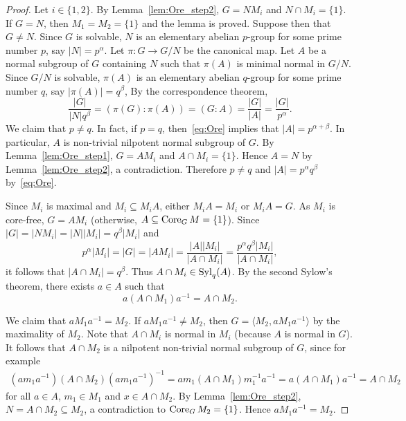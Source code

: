 \begin{proof}
    Let $i\in\{1,2\}$. 
    By Lemma~\ref{lem:Ore_step2}, $G=NM_i$ and $N\cap M_i=\{1\}$. If $G=N$, then 
    $M_1=M_2=\{1\}$ and the lemma is proved. Suppose then that $G\ne N$. Since 
    $G$ is solvable, $N$ is an elementary abelian $p$-group for some prime number $p$, 
    say $|N|=p^{\alpha}$. Let $\pi\colon G\to G/N$ be the canonical map. Let $A$ be a normal subgroup of $G$ 
    containing $N$ 
    such that $\pi(A)$ is minimal normal in $G/N$. Since $G/N$ is solvable, $\pi(A)$ is an 
    elementary abelian $q$-group for some prime number $q$, say $|\pi(A)|=q^\beta$, 
    By the correspondence theorem, 
    \begin{equation}
        \label{eq:Ore}
        \frac{|G|}{|N|q^\beta}=(\pi(G):\pi(A))=(G:A)=\frac{|G|}{|A|}=\frac{|G|}{p^\alpha}.
    \end{equation}
    We claim that $p\ne q$. In fact, if $p=q$, then~\eqref{eq:Ore} implies that $|A|=p^{\alpha+\beta}$. In particular, 
    $A$ is non-trivial nilpotent normal subgroup of $G$. 
    By Lemma~\ref{lem:Ore_step1}, $G=AM_i$ and $A\cap M_i=\{1\}$. Hence $A=N$ by Lemma~\ref{lem:Ore_step2}, a contradiction. 
    Therefore $p\ne q$ and $|A|=p^{\alpha}q^\beta$ by~\eqref{eq:Ore}. 

    Since $M_i$ is maximal and $M_i\subseteq M_iA$, either $M_iA=M_i$ or $M_iA=G$. As $M_i$ is core-free, 
    $G=AM_i$ (otherwise, $A\subseteq\operatorname{Core}_GM=\{1\}$). 
    Since $|G|=|NM_i|=|N||M_i|=q^\beta|M_i|$ and 
    \[
    p^\alpha|M_i|=|G|=|AM_i|=\frac{|A||M_i|}{|A\cap M_i|}=\frac{p^\alpha q^\beta|M_i|}{|A\cap M_i|}, 
    \]
    it follows that $|A\cap M_i|=q^\beta$. Thus $A\cap M_i\in\mathrm{Syl}_q(A)$. 
    By the second Sylow's theorem, there exists $a\in A$ such that 
    \[
    a(A\cap M_1)a^{-1}=A\cap M_2.
    \]

    We claim that $aM_1a^{-1}=M_2$. 
    If $aM_1a^{-1}\ne M_2$, then $G=\langle M_2,aM_1a^{-1}\rangle$ by the maximality of $M_2$. Note that  
    $A\cap M_i$ is normal in $M_i$ (because $A$ is normal in $G$). It follows that 
    $A\cap M_2$ is a nilpotent non-trivial 
    normal subgroup of $G$, since for example 
    \begin{align*}
    (am_1a^{-1})(A\cap M_2)(am_1a^{-1})^{-1}
    =am_1(A\cap M_1)m_1^{-1}a^{-1}
    =a(A\cap M_1)a^{-1}
    =A\cap M_2
    \end{align*}
    for all $a\in A$, $m_1\in M_1$ and $x\in A\cap M_2$. By Lemma~\ref{lem:Ore_step2}, 
    $N=A\cap M_2\subseteq M_2$, a contradiction to $\operatorname{Core}_GM_2=\{1\}$. Hence 
    $aM_1a^{-1}=M_2$. 
\end{proof}

